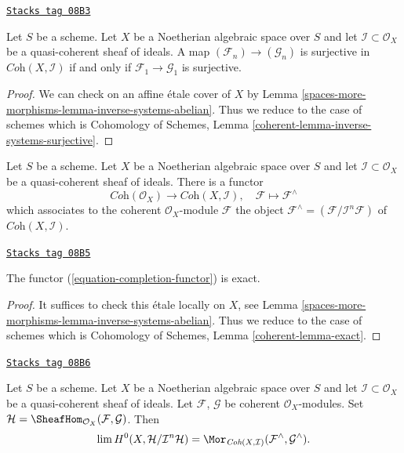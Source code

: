 \begin{lemma}
\label{spaces-more-morphisms-lemma-inverse-systems-surjective}
\href{https://stacks.math.columbia.edu/tag/08B3}{\texttt{Stacks tag 08B3}}

Let $S$ be a scheme. Let $X$ be a Noetherian algebraic space over $S$
and let $\mathcal{I} \subset \mathcal{O}_X$ be a quasi-coherent sheaf
of ideals. A map $(\mathcal{F}_n) \to (\mathcal{G}_n)$ is surjective in
$\textit{Coh}(X, \mathcal{I})$ if and only if
$\mathcal{F}_1 \to \mathcal{G}_1$ is surjective.
\end{lemma}

\begin{proof}
We can check on an affine \'etale cover of $X$ by
Lemma \ref{spaces-more-morphisms-lemma-inverse-systems-abelian}.
Thus we reduce to the case of schemes which is
Cohomology of Schemes, Lemma \ref{coherent-lemma-inverse-systems-surjective}.
\end{proof}

Let $S$ be a scheme. Let $X$ be a Noetherian algebraic space over $S$ and
let $\mathcal{I} \subset \mathcal{O}_X$ be a quasi-coherent sheaf of ideals.
There is a functor
\begin{equation}
\label{equation-completion-functor}
\textit{Coh}(\mathcal{O}_X) \longrightarrow \textit{Coh}(X, \mathcal{I}), \quad
\mathcal{F} \longmapsto \mathcal{F}^\wedge
\end{equation}
which associates to the coherent $\mathcal{O}_X$-module $\mathcal{F}$
the object $\mathcal{F}^\wedge = (\mathcal{F}/\mathcal{I}^n\mathcal{F})$
of $\textit{Coh}(X, \mathcal{I})$.

\begin{lemma}[Exact]
\label{spaces-more-morphisms-lemma-exact}
\href{https://stacks.math.columbia.edu/tag/08B5}{\texttt{Stacks tag 08B5}}

The functor (\ref{equation-completion-functor}) is exact.
\end{lemma}

\begin{proof}
It suffices to check this \'etale locally on $X$, see
Lemma \ref{spaces-more-morphisms-lemma-inverse-systems-abelian}.
Thus we reduce to the case of schemes which is
Cohomology of Schemes, Lemma \ref{coherent-lemma-exact}.
\end{proof}

\begin{lemma}
\label{spaces-more-morphisms-lemma-completion-internal-hom}
\href{https://stacks.math.columbia.edu/tag/08B6}{\texttt{Stacks tag 08B6}}

Let $S$ be a scheme. Let $X$ be a Noetherian algebraic space over $S$ and
let $\mathcal{I} \subset \mathcal{O}_X$ be a quasi-coherent sheaf of ideals.
Let $\mathcal{F}$, $\mathcal{G}$ be coherent $\mathcal{O}_X$-modules. Set
$\mathcal{H} = \SheafHom_{\mathcal{O}_X}(\mathcal{F}, \mathcal{G})$.
Then
$$
\lim H^0(X, \mathcal{H}/\mathcal{I}^n\mathcal{H}) =
\Mor_{\textit{Coh}(X, \mathcal{I})}
(\mathcal{F}^\wedge, \mathcal{G}^\wedge).
$$
\end{lemma}

